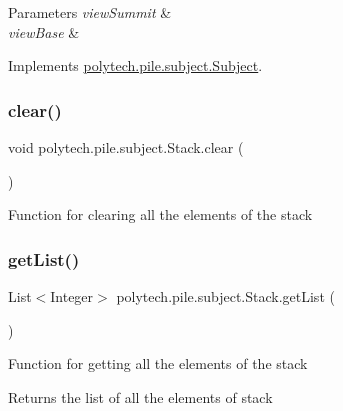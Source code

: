 \begin{DoxyParams}{Parameters}
{\em view\+Summit} & \\
\hline
{\em view\+Base} & \\
\hline
\end{DoxyParams}


Implements \hyperlink{interfacepolytech_1_1pile_1_1subject_1_1_subject_aea16ce079223e1d998880ffbea5a923f}{polytech.\+pile.\+subject.\+Subject}.

\hypertarget{classpolytech_1_1pile_1_1subject_1_1_stack_a6858b0948d676f466fd6f07f9bf0b8cb}{}\label{classpolytech_1_1pile_1_1subject_1_1_stack_a6858b0948d676f466fd6f07f9bf0b8cb} 
\subsubsection{\texorpdfstring{clear()}{clear()}}
{\footnotesize\ttfamily void polytech.\+pile.\+subject.\+Stack.\+clear (\begin{DoxyParamCaption}{ }\end{DoxyParamCaption})}

Function for clearing all the elements of the stack \hypertarget{classpolytech_1_1pile_1_1subject_1_1_stack_afc9fff3b1d8f384029611fdf16dd09b0}{}\label{classpolytech_1_1pile_1_1subject_1_1_stack_afc9fff3b1d8f384029611fdf16dd09b0} 
\subsubsection{\texorpdfstring{get\+List()}{getList()}}
{\footnotesize\ttfamily List$<$Integer$>$ polytech.\+pile.\+subject.\+Stack.\+get\+List (\begin{DoxyParamCaption}{ }\end{DoxyParamCaption})}

Function for getting all the elements of the stack

\begin{DoxyReturn}{Returns}
the list of all the elements of stack 
\end{DoxyReturn}
\hypertarget{classpolytech_1_1pile_1_1subject_1_1_stack_a370de235d9d913914a2c46035f9b9465}{}\label{classpolytech_1_1pile_1_1subject_1_1_stack_a370de235d9d913914a2c46035f9b9465} 
